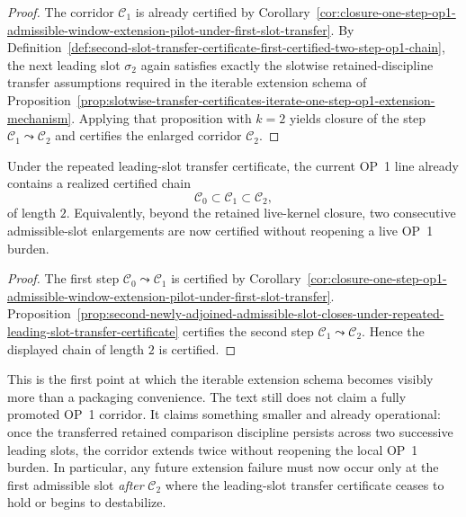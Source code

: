 \begin{proof}
The corridor $\mathcal C_1$ is already certified by Corollary~\ref{cor:closure-one-step-op1-admissible-window-extension-pilot-under-first-slot-transfer}. By Definition~\ref{def:second-slot-transfer-certificate-first-certified-two-step-op1-chain}, the next leading slot $\sigma_2$ again satisfies exactly the slotwise retained-discipline transfer assumptions required in the iterable extension schema of Proposition~\ref{prop:slotwise-transfer-certificates-iterate-one-step-op1-extension-mechanism}. Applying that proposition with $k=2$ yields closure of the step $\mathcal C_1\leadsto \mathcal C_2$ and certifies the enlarged corridor $\mathcal C_2$.
\end{proof}

\begin{corollary}
\label{cor:first-realized-certified-two-slot-op1-admissible-window-chain}
Under the repeated leading-slot transfer certificate, the current OP~1 line already contains a realized certified chain
\[
  \mathcal C_0\subset \mathcal C_1\subset \mathcal C_2,
\]
of length $2$. Equivalently, beyond the retained live-kernel closure, two consecutive admissible-slot enlargements are now certified without reopening a live OP~1 burden.
\end{corollary}

\begin{proof}
The first step $\mathcal C_0\leadsto \mathcal C_1$ is certified by Corollary~\ref{cor:closure-one-step-op1-admissible-window-extension-pilot-under-first-slot-transfer}. Proposition~\ref{prop:second-newly-adjoined-admissible-slot-closes-under-repeated-leading-slot-transfer-certificate} certifies the second step $\mathcal C_1\leadsto \mathcal C_2$. Hence the displayed chain of length $2$ is certified.
\end{proof}

\begin{remark}
\label{rem:what-first-realized-two-slot-chain-now-buys}
This is the first point at which the iterable extension schema becomes visibly more than a packaging convenience. The text still does not claim a fully promoted OP~1 corridor. It claims something smaller and already operational: once the transferred retained comparison discipline persists across two successive leading slots, the corridor extends twice without reopening the local OP~1 burden. In particular, any future extension failure must now occur only at the first admissible slot \emph{after} $\mathcal C_2$ where the leading-slot transfer certificate ceases to hold or begins to destabilize.
\end{remark}


